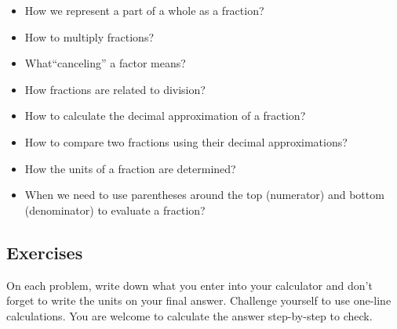 \begin{itemize} 
\item How we represent a part of a whole as a fraction? %
\item How to multiply fractions?  %
\item What``canceling'' a factor means? %
\item How fractions are related to division? %
\item How to calculate the decimal approximation of a fraction? %
\item How to compare two fractions using their decimal approximations? %
\item How the units of a fraction are determined?  %
\item When we need to use parentheses around the top (numerator) and bottom (denominator) to evaluate a fraction? %
  
\end{itemize}

\subsection*{Exercises}

On each problem, write down what you enter into your calculator and don't forget to write the units on your final answer.  Challenge yourself to use one-line calculations. You are welcome to calculate the answer step-by-step to check.

